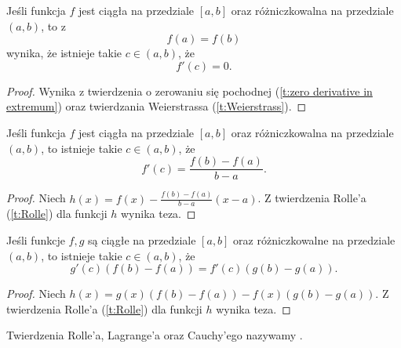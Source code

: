 \begin{theorem}[Rolle'a]
    \label{t:Rolle}
    Jeśli funkcja $f$ jest ciągła na przedziale $[a, b]$ oraz różniczkowalna na przedziale $(a, b)$, to z
    \[ f(a) = f(b) \]
    wynika, że istnieje takie $c \in (a, b)$, że
    \[ f'(c) = 0. \]
\end{theorem}
\begin{proof}
    Wynika z twierdzenia o zerowaniu się pochodnej (\ref{t:zero derivative in extremum}) oraz twierdzania Weierstrassa (\ref{t:Weierstrass}).
\end{proof}

\begin{theorem}[Lagrange'a]
    Jeśli funkcja $f$ jest ciągła na przedziale $[a, b]$ oraz różniczkowalna na przedziale $(a, b)$, to istnieje takie $c \in (a, b)$, że
    \[ f'(c) = \frac{f(b) - f(a)}{b - a}. \]
\end{theorem}
\begin{proof}
    Niech $h(x) = f(x) - \frac{f(b) - f(a)}{b - a}(x - a)$. Z twierdzenia Rolle'a (\ref{t:Rolle}) dla funkcji $h$ wynika teza.
\end{proof}

\begin{theorem}
    Jeśli funkcje $f, g$ są ciągłe na przedziale $[a, b]$ oraz różniczkowalne na przedziale $(a, b)$, to istnieje takie $c \in (a, b)$, że
    \[ g'(c) (f(b) - f(a)) = f'(c) (g(b) - g(a)). \]
\end{theorem}
\begin{proof}
    Niech $h(x) = g(x)(f(b) - f(a)) - f(x)(g(b) - g(a))$. Z twierdzenia Rolle'a (\ref{t:Rolle}) dla funkcji $h$ wynika teza.
\end{proof}

Twierdzenia Rolle'a, Lagrange'a oraz Cauchy'ego nazywamy .

